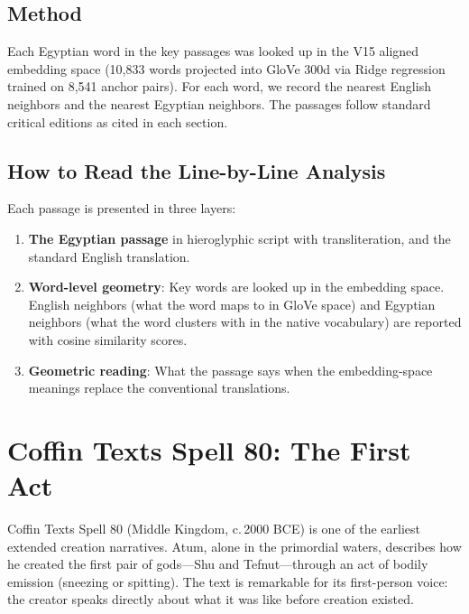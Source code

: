 \documentclass[11pt, a4paper]{article}
\begin{document}
\subsection{Method}

Each Egyptian word in the key passages was looked up in the V15 aligned embedding space (10,833 words projected into GloVe 300d via Ridge regression trained on 8,541 anchor pairs). For each word, we record the nearest English neighbors and the nearest Egyptian neighbors. The passages follow standard critical editions as cited in each section.

\subsection{How to Read the Line-by-Line Analysis}

Each passage is presented in three layers:

\begin{enumerate}
    \item {\color{passage}\textbf{The Egyptian passage}} in hieroglyphic script with transliteration, and the standard English translation.
    \item \textbf{Word-level geometry}: Key words are looked up in the embedding space. English neighbors (what the word maps to in GloVe space) and Egyptian neighbors (what the word clusters with in the native vocabulary) are reported with cosine similarity scores.
    \item {\color{insight}\textbf{Geometric reading}}: What the passage says when the embedding-space meanings replace the conventional translations.
\end{enumerate}

\section{Coffin Texts Spell 80: The First Act}
\label{sec:ct80}

Coffin Texts Spell 80 (Middle Kingdom, c.\,2000 BCE) is one of the earliest extended creation narratives. Atum, alone in the primordial waters, describes how he created the first pair of gods---Shu and Tefnut---through an act of bodily emission (sneezing or spitting). The text is remarkable for its first-person voice: the creator speaks directly about what it was like before creation existed.
\end{document}
